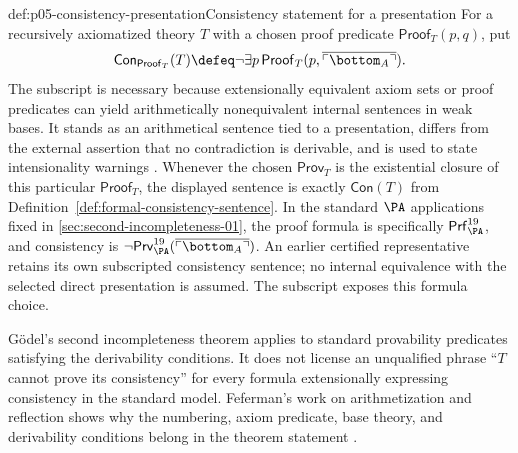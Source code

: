 \begin{hbdefinition}{def:p05-consistency-presentation}{Consistency statement for a presentation}
For a recursively axiomatized theory \(T\) with a chosen proof predicate
\(\mathsf{Proof}_T(p,q)\), put
\[
 \mathsf{Con}_{\mathsf{Proof}_T}(T)
 \defeq \neg\exists p\,\mathsf{Proof}_T
   (p,\overline{\ulcorner\bottom_A\urcorner}).
\]
The subscript is necessary because extensionally equivalent axiom sets or proof
predicates can yield arithmetically nonequivalent internal sentences in weak
bases. It stands as an arithmetical sentence tied to a presentation, differs
from the external assertion that no contradiction is derivable, and is used
to state intensionality warnings \cite{Feferman1960}. Whenever the chosen
\(\mathsf{Prov}_T\) is the existential closure of this particular
\(\mathsf{Proof}_T\), the displayed sentence is exactly
\(\mathsf{Con}(T)\) from
Definition~\ref{def:formal-consistency-sentence}. In the standard \(\PA\)
applications fixed in \cref{sec:second-incompleteness-01}, the proof formula
is specifically \(\mathsf{Prf}^{19}_{\PA}\), and consistency is
\(\neg\mathsf{Prv}^{19}_{\PA}
(\overline{\ulcorner\bottom_A\urcorner})\).
An earlier certified representative retains its own subscripted consistency
sentence; no internal equivalence with the selected direct presentation is
assumed. The subscript exposes this formula choice.
\end{hbdefinition}

G\"odel's second incompleteness theorem applies to standard provability
predicates satisfying the derivability conditions. It does not license an
unqualified phrase ``\(T\) cannot prove its consistency'' for every formula
extensionally expressing consistency in the standard model. Feferman's work
on arithmetization and reflection shows why the numbering, axiom predicate,
base theory, and derivability conditions belong in the theorem statement
\cite{Feferman1960}.

